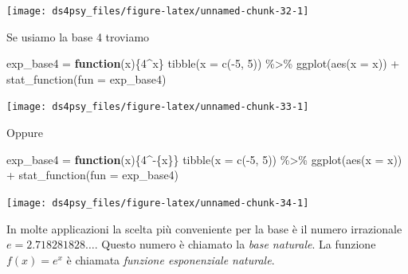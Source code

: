 \documentclass[
  11pt,
]{krantz}
\makeatletter
\newenvironment{Shaded}{\begin{snugshade}}{\end{snugshade}}
\newcommand{\AttributeTok}[1]{\textcolor[rgb]{0.61,0.61,0.61}{#1}}
\newcommand{\ControlFlowTok}[1]{\textcolor[rgb]{0.27,0.27,0.27}{\textbf{#1}}}
\newcommand{\DecValTok}[1]{\textcolor[rgb]{0.06,0.06,0.06}{#1}}
\newcommand{\FunctionTok}[1]{\textcolor[rgb]{0,0,0}{#1}}
\newcommand{\NormalTok}[1]{#1}
\newcommand{\OtherTok}[1]{\textcolor[rgb]{0.37,0.37,0.37}{#1}}
\newcommand{\SpecialCharTok}[1]{\textcolor[rgb]{0,0,0}{#1}}
\newenvironment{kframe}{%
\medskip{}
\setlength{\fboxsep}{.8em}
 \def\at@end@of@kframe{}%
 \ifinner\ifhmode%
  \def\at@end@of@kframe{\end{minipage}}%
  \begin{minipage}{\columnwidth}%
 \fi\fi%
 \def\FrameCommand##1{\hskip\@totalleftmargin \hskip-\fboxsep
 \colorbox{shadecolor}{##1}\hskip-\fboxsep
     \hskip-\linewidth \hskip-\@totalleftmargin \hskip\columnwidth}%
 \MakeFramed {\advance\hsize-\width
   \@totalleftmargin\z@ \linewidth\hsize
   \@setminipage}}%
 {\par\unskip\endMakeFramed%
 \at@end@of@kframe}
\renewenvironment{Shaded}{\begin{kframe}}{\end{kframe}}
\theoremstyle{definition}
\theoremstyle{definition}
\theoremstyle{definition}
\theoremstyle{definition}
\theoremstyle{remark}
\makeatother
\begin{document}
\begin{center}\texttt{[image: ds4psy\_files/figure-latex/unnamed-chunk-32-1]} \end{center}

Se usiamo la base 4 troviamo

\begin{Shaded}
\begin{Highlighting}[]
\NormalTok{exp\_base4 }\OtherTok{=} \ControlFlowTok{function}\NormalTok{(x)\{}\DecValTok{4}\SpecialCharTok{\^{}}\NormalTok{x\}}
\FunctionTok{tibble}\NormalTok{(}\AttributeTok{x =} \FunctionTok{c}\NormalTok{(}\SpecialCharTok{{-}}\DecValTok{5}\NormalTok{, }\DecValTok{5}\NormalTok{)) }\SpecialCharTok{\%\textgreater{}\%}
\FunctionTok{ggplot}\NormalTok{(}\FunctionTok{aes}\NormalTok{(}\AttributeTok{x =}\NormalTok{ x)) }\SpecialCharTok{+}
  \FunctionTok{stat\_function}\NormalTok{(}\AttributeTok{fun =}\NormalTok{ exp\_base4)}
\end{Highlighting}
\end{Shaded}

\begin{center}\texttt{[image: ds4psy\_files/figure-latex/unnamed-chunk-33-1]} \end{center}

Oppure

\begin{Shaded}
\begin{Highlighting}[]
\NormalTok{exp\_base4 }\OtherTok{=} \ControlFlowTok{function}\NormalTok{(x)\{}\DecValTok{4}\SpecialCharTok{\^{}{-}}\NormalTok{\{x\}\}}
\FunctionTok{tibble}\NormalTok{(}\AttributeTok{x =} \FunctionTok{c}\NormalTok{(}\SpecialCharTok{{-}}\DecValTok{5}\NormalTok{, }\DecValTok{5}\NormalTok{)) }\SpecialCharTok{\%\textgreater{}\%}
\FunctionTok{ggplot}\NormalTok{(}\FunctionTok{aes}\NormalTok{(}\AttributeTok{x =}\NormalTok{ x)) }\SpecialCharTok{+}
  \FunctionTok{stat\_function}\NormalTok{(}\AttributeTok{fun =}\NormalTok{ exp\_base4)}
\end{Highlighting}
\end{Shaded}

\begin{center}\texttt{[image: ds4psy\_files/figure-latex/unnamed-chunk-34-1]} \end{center}

In molte applicazioni la scelta più conveniente per la base è il numero irrazionale \(e = 2.718281828\dots\). Questo numero è chiamato la \emph{base naturale}. La funzione \(f(x) = e^x\) è chiamata \emph{funzione esponenziale naturale}.
\end{document}
